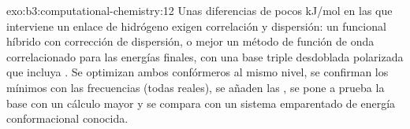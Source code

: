 \begin{solution}{exo:b3:computational-chemistry:12}
Unas diferencias de pocos \unit{kJ/mol} en las que interviene un enlace de hidrógeno exigen correlación y
dispersión: un funcional híbrido con corrección de dispersión, o mejor un
método de función de onda correlacionado para las energías finales, con una base
triple desdoblada polarizada que incluya . Se optimizan ambos confórmeros al
mismo nivel, se confirman los mínimos con las frecuencias (todas reales), se añaden las , se pone a prueba la base con un cálculo mayor y se compara con un
sistema emparentado de energía conformacional conocida.
\end{solution}

